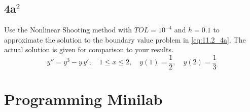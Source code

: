 \documentclass[12pt]{article}
\begin{document}
\subsection{4a$^2$}
Use the Nonlinear Shooting method with $TOL=10^{-4}$ and $h=0.1$ to
approximate the solution to the boundary value problem in
\cref{eq:11.2_4a}.  The actual solution is given for comparison to
your results.
\begin{equation}
  \label{eq:11.2_4a}
  y''=y^3-y\,y',\quad 1\leq x\leq 2,\quad y(1)=\frac{1}{2},\quad 
  y(2)=\frac{1}{3}
\end{equation}

\section{Programming Minilab}
\end{document}
